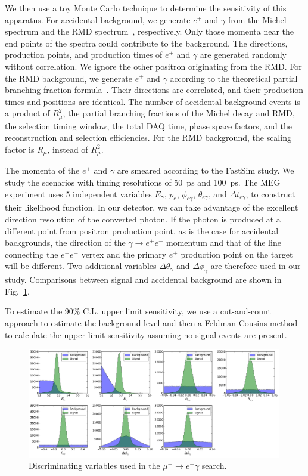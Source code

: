 We then use a toy Monte Carlo technique to determine the sensitivity of this
apparatus.
For accidental background, we generate $e^+$ and $\gamma$ from the Michel
spectrum and the RMD spectrum~\cite{Kuno:1999jp}, respectively. Only those momenta
near the end points of the spectra could contribute to the background.
The directions, production points, and production times of $e^+$ and 
$\gamma$ are generated
randomly without correlation. We ignore the other positron originating from the RMD.
For the RMD background, we generate $e^+$ and $\gamma$ according to the theoretical
partial branching fraction formula~\cite{Kuno:1999jp}. Their directions are
correlated, and their production times and positions are identical.
The number of accidental background events is a product of $R_\mu^2$, the partial
branching fractions of the Michel decay and RMD, the selection timing window, the
total DAQ time, phase space factors, and the reconstruction and selection 
efficiencies. For the RMD background, the scaling factor is $R_\mu$, instead of
$R_\mu^2$.

The momenta 
of the $e^+$ and $\gamma$ are smeared according to the FastSim study. 
We study the scenarios with timing resolutions of 50~ps and 100~ps. 
The MEG experiment uses 5 independent variables $E_\gamma$, $p_e$, 
$\phi_{e\gamma}$, $\theta_{e\gamma}$, and $\Delta t_{e\gamma}$, to construct
their likelihood function. In our detector, we can take advantage of the excellent
direction resolution of the converted photon. If the photon is produced
at a different point from positron production point, as is the case for accidental backgrounds,
the direction of the $\gamma\to e^+e^-$ momentum and that of the line
connecting the $e^+e^-$ vertex and the primary $e^+$ production point on the target
will be different.  Two additional variables $\Delta\theta_\gamma$ 
and $\Delta\phi_\gamma$ are therefore used in our study. Comparisons between signal
and accidental background are shown in Fig.~\ref{fig:muegamma-vars}.

To estimate the 90\% C.L. upper limit sensitivity, we use a cut-and-count
approach to estimate the background level and then a Feldman-Cousins 
method~\cite{Feldman:1997qc} to calculate the upper limit sensitivity assuming
no signal events are present.



\begin{figure}[htbp]
\includegraphics[width=0.99\textwidth]{Figures/sens-vardists-50ps.pdf}
\caption{Discriminating variables used in the $\mu^+\to e^+\gamma$ search.}
\label{fig:muegamma-vars}
\end{figure}

